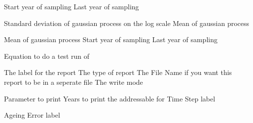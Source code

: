  {Start year of sampling}
 {Last year of sampling}
\par\textbf{}\par
{} {Standard deviation of gaussian process on the log scale}
 {Mean of gaussian process}
\par\textbf{}\par
{} {Mean of gaussian process}
 {Start year of sampling}
 {Last year of sampling}
\par\textbf{}\par
{} {Equation to do a test run of}
\par\par
{} {The label for the report}
 {The type of report}
 {The File Name if you want this report to be in a seperate file}
 {The write mode}
\par\textbf{}\par
{} {Parameter to print}
 {Years to print the addressable for}
 {Time Step label}
\par\textbf{}\par
{} {Ageing Error label}
\par\textbf{}\par
\par\textbf{}\par
\par\textbf{}\par
\par\textbf{}\par
\par\textbf{}\par
\par\textbf{}\par
\par\textbf{}\par
